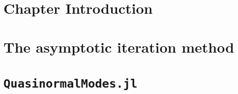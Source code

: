 \section{Chapter Introduction}
\label{ch:qnm_aim:sec:intro}


\section{The asymptotic iteration method}
\label{ch:qnm_aim:sec:mp_penrose}


\section{\texttt{QuasinormalModes.jl}}
\label{ch:qnm_aim:sec:cmmr_penrose}

